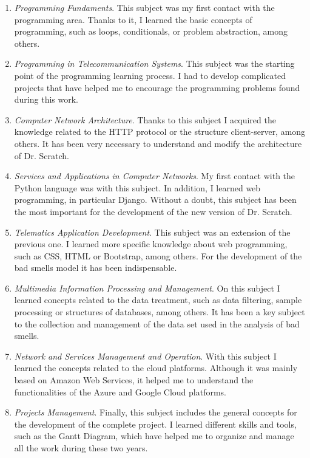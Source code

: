 \begin{enumerate}
  \item \textit{Programming Fundaments}. This subject was my first contact with the programming area. Thanks to it, I learned the basic concepts of programming, such as loops, conditionals, or problem abstraction, among others. 
  \item \textit{Programming in Telecommunication Systems}. This subject was the starting point of the programming learning process. I had to develop complicated projects that have helped me to encourage the programming problems found during this work.
  \item \textit{Computer Network Architecture}. Thanks to this subject I acquired the knowledge related to the HTTP protocol or the structure client-server, among others. It has been very necessary to understand and modify the architecture of Dr. Scratch.  
  \item \textit{Services and Applications in Computer Networks}. My first contact with the Python language was with this subject. In addition, I learned web programming, in particular Django. Without a doubt, this subject has been the most important for the development of the new version of Dr. Scratch.
  \item \textit{Telematics Application Development}. This subject was an extension of the previous one. I learned more specific knowledge about web programming, such as CSS, HTML or Bootstrap, among others. For the development of the bad smells model it has been indispensable. 
  \item \textit{Multimedia Information Processing and Management}. On this subject I learned concepts related to the data treatment, such as data filtering, sample processing or structures of databases, among others. It has been a key subject to the collection and management of the data set used in the analysis of bad smells. 
  \item \textit{Network and Services Management and Operation}. With this subject I learned the concepts related to the cloud platforms. Although it was mainly based on Amazon Web Services, it helped me to understand the functionalities of the Azure and Google Cloud platforms. 
  \item \textit{Projects Management}. Finally, this subject includes the general concepts for the development of the complete project. I learned different skills and tools, such as the Gantt Diagram, which have helped me to organize and manage all the work during these two years. 
\end{enumerate}


